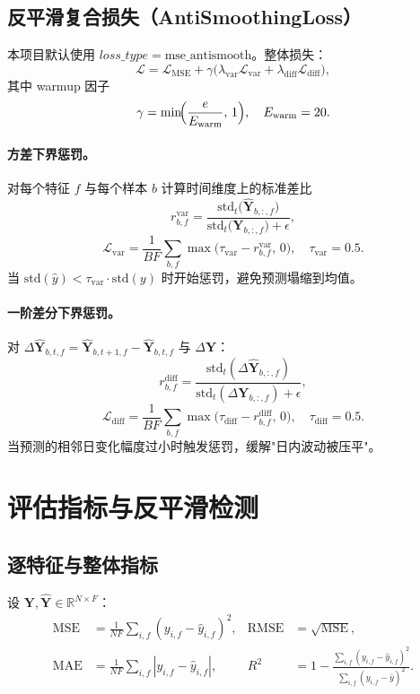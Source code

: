 \documentclass[11pt,a4paper]{article}
\newcommand{\R}{\mathbb{R}}
\newcommand{\mat}[1]{\bm{#1}}
\begin{document}
\subsection{反平滑复合损失（AntiSmoothingLoss）}
本项目默认使用 $loss\_type = \text{mse\_antismooth}$。整体损失：
\begin{equation}
\mathcal{L} = \mathcal{L}_{\text{MSE}} + \gamma \bigl(\lambda_{\text{var}}\mathcal{L}_{\text{var}} + \lambda_{\text{diff}}\mathcal{L}_{\text{diff}}\bigr),
\end{equation}
其中 warmup 因子
\[
\gamma = \min\!\Bigl(\frac{e}{E_{\text{warm}}},\, 1\Bigr),\quad E_{\text{warm}} = 20.
\]

\paragraph{方差下界惩罚。}
对每个特征 $f$ 与每个样本 $b$ 计算时间维度上的标准差比
\[
r^{\text{var}}_{b,f} = \frac{\mathrm{std}_{t}\bigl(\widehat{\mat{Y}}_{b,:,f}\bigr)}
{\mathrm{std}_{t}\bigl(\mat{Y}_{b,:,f}\bigr) + \epsilon},
\]
\[
\mathcal{L}_{\text{var}} = \frac{1}{BF}\sum_{b,f}\max\!\bigl(\tau_{\text{var}} - r^{\text{var}}_{b,f},\, 0\bigr),
\quad \tau_{\text{var}} = 0.5.
\]
当 $\mathrm{std}(\widehat y) < \tau_{\text{var}}\cdot \mathrm{std}(y)$ 时开始惩罚，避免预测塌缩到均值。

\paragraph{一阶差分下界惩罚。}
对 $\Delta\widehat{\mat{Y}}_{b,t,f} = \widehat{\mat{Y}}_{b,t+1,f} - \widehat{\mat{Y}}_{b,t,f}$ 与 $\Delta\mat{Y}$：
\[
r^{\text{diff}}_{b,f} = \frac{\mathrm{std}_t(\Delta\widehat{\mat{Y}}_{b,:,f})}
{\mathrm{std}_t(\Delta\mat{Y}_{b,:,f}) + \epsilon},
\]
\[
\mathcal{L}_{\text{diff}} = \frac{1}{BF}\sum_{b,f}\max\!\bigl(\tau_{\text{diff}} - r^{\text{diff}}_{b,f},\, 0\bigr),
\quad \tau_{\text{diff}} = 0.5.
\]
当预测的相邻日变化幅度过小时触发惩罚，缓解"日内波动被压平"。

\section{评估指标与反平滑检测}

\subsection{逐特征与整体指标}
设 $\mat{Y}, \widehat{\mat{Y}} \in \R^{N\times F}$：
\begin{align}
\mathrm{MSE}    &= \frac{1}{NF}\sum_{i,f}(y_{i,f} - \widehat{y}_{i,f})^2, &
\mathrm{RMSE} &= \sqrt{\mathrm{MSE}},\\
\mathrm{MAE}    &= \frac{1}{NF}\sum_{i,f}|y_{i,f} - \widehat{y}_{i,f}|, &
R^2           &= 1 - \frac{\sum_{i,f}(y_{i,f} - \widehat{y}_{i,f})^2}
                           {\sum_{i,f}(y_{i,f} - \bar y)^2}.
\end{align}
\end{document}
